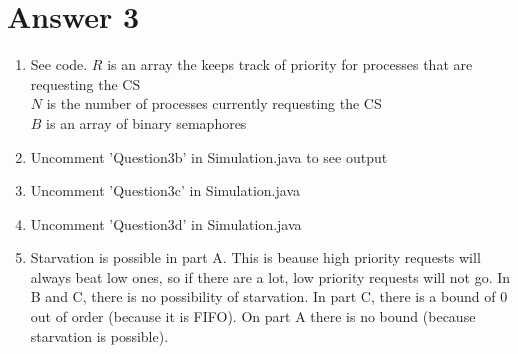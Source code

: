 \documentclass[11pt]{article}
\theoremstyle{definition}
\begin{document}
\section*{Answer 3}
\begin{enumerate}
	\item See code.  $R$ is an array the keeps track of priority for processes that are requesting the CS\\
	$N$ is the number of processes currently requesting the CS\\
	$B$ is an array of binary semaphores

	\item Uncomment 'Question3b' in Simulation.java to see output

	\item Uncomment 'Question3c' in Simulation.java

	\item Uncomment 'Question3d' in Simulation.java

	\item Starvation is possible in part A.  This is beause high priority requests will always beat low ones, so if there are a lot, low priority requests will not go.  In B and C, there is no possibility of starvation.  In part C, there is a bound of 0 out of order (because it is FIFO).  On part A there is no bound (because starvation is possible).
\end{enumerate}
\end{document}
